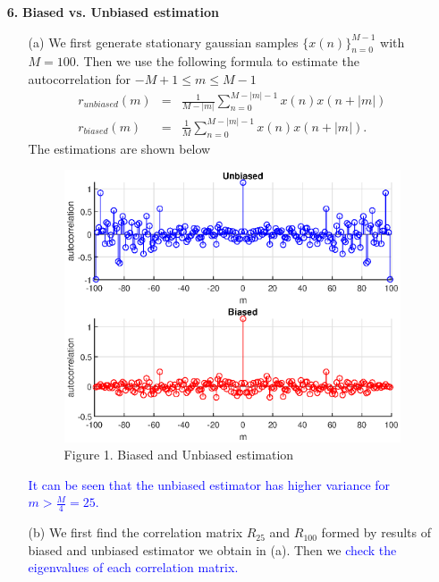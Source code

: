 \documentclass[letterpaper,12pt]{article}
\begin{document}
  \begin{enumerate}
    \item[{\bf 6. }]  \textbf{Biased vs. Unbiased estimation} \hfill \\
    \begin{itemize}
      \item[(a)] We first generate stationary gaussian samples $\{x(n)\}_{n=0}^{M-1}$ with $M = 100$.
      Then we use the following formula to estimate the autocorrelation for $-M+1 \leq m \leq M-1$
      \begin{eqnarray*}
        r_{unbiased}(m) & = & \frac{1}{M - |m|} \sum_{n=0}^{M - |m| - 1} x(n)x(n + |m|) \\
        r_{biased}(m)   & = & \frac{1}{M} \sum_{n=0}^{M - |m| - 1} x(n)x(n + |m|). 
      \end{eqnarray*}
      The estimations are shown below
      \begin{figure}[H]
        \centering
        \includegraphics[scale = 1.0]{autocorrelation.eps}
        \caption{Figure 1. Biased and Unbiased estimation}
      \end{figure}
      \textcolor{blue}{It can be seen that the unbiased estimator has higher variance for $m > \frac{M}{4} = 25$.}
      \item[(b)] We first find the correlation matrix $R_{25}$ and $R_{100}$ formed by results of 
      biased and unbiased estimator we obtain in (a). Then we \textcolor{blue}{check the eigenvalues of each correlation matrix.}

\end{itemize}
\end{enumerate}
\end{document}
